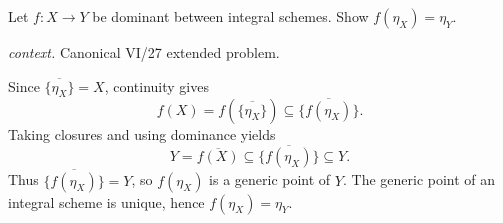 \begin{problem}\label{prob:vi27-p11}
Let \(f:X\to Y\) be dominant between integral schemes. Show \(f(\eta_X)=\eta_Y\).
\par\smallskip\noindent\textit{context.} Canonical VI/27 extended problem.
\end{problem}

\ifdefined\FullProblemDossiers
\begin{solution}
Since \(\overline{\{\eta_X\}}=X\), continuity gives
\[
f(X)=f(\overline{\{\eta_X\}})\subseteq\overline{\{f(\eta_X)\}}.
\]
Taking closures and using dominance yields
\[
Y=\overline{f(X)}\subseteq\overline{\{f(\eta_X)\}}\subseteq Y.
\]
Thus \(\overline{\{f(\eta_X)\}}=Y\), so \(f(\eta_X)\) is a generic point of \(Y\). The generic point of an
integral scheme is unique, hence \(f(\eta_X)=\eta_Y\).
\end{solution}
\fi
